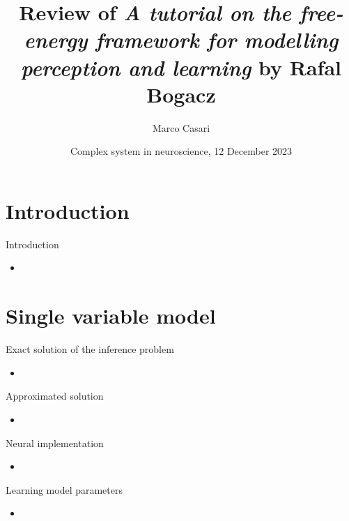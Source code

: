 \documentclass[aspectratio=43]{beamer}
\title{Review of \emph{A tutorial on the free-energy framework for modelling perception and learning} by Rafal Bogacz}
\author{Marco Casari}
\date[12/12/2023]{Complex system in neuroscience, 12 December 2023}
\institute[UniTo]{University of Turin}
\begin{document}
\begin{frame}
  \titlepage
  \note{
    \begin{itemize}
      \item %
    \end{itemize}
  }
\end{frame}



\section{Introduction}
\begin{frame}{Introduction}
  \begin{itemize}
    \item %
  \end{itemize}
\end{frame}



\section{Single variable model}
\begin{frame}{Exact solution of the inference problem}
  \begin{itemize}
    \item %
  \end{itemize}
\end{frame}


\begin{frame}{Approximated solution}
  \begin{itemize}
    \item %
  \end{itemize}
\end{frame}


\begin{frame}{Neural implementation}
  \begin{itemize}
    \item %
  \end{itemize}
\end{frame}


\begin{frame}{Learning model parameters}
  \begin{itemize}
    \item %
  \end{itemize}
\end{frame}
\end{document}
